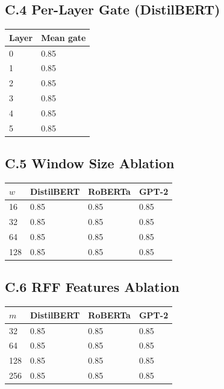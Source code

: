\subsection{C.4 Per-Layer Gate (DistilBERT)}

\begin{table}[H]
\centering
\small
\begin{tabular}{ll}
\toprule
\textbf{Layer} & \textbf{Mean gate} \\
\midrule
0 & 0.85 \\
1 & 0.85 \\
2 & 0.85 \\
3 & 0.85 \\
4 & 0.85 \\
5 & 0.85 \\
\bottomrule
\end{tabular}
\end{table}

\subsection{C.5 Window Size Ablation}

\begin{table}[H]
\centering
\small
\begin{tabular}{llll}
\toprule
\textbf{$w$} & \textbf{DistilBERT} & \textbf{RoBERTa} & \textbf{GPT-2} \\
\midrule
16 & 0.85 & 0.85 & 0.85 \\
32 & 0.85 & 0.85 & 0.85 \\
64 & 0.85 & 0.85 & 0.85 \\
128 & 0.85 & 0.85 & 0.85 \\
\bottomrule
\end{tabular}
\end{table}

\subsection{C.6 RFF Features Ablation}

\begin{table}[H]
\centering
\small
\begin{tabular}{llll}
\toprule
\textbf{$m$} & \textbf{DistilBERT} & \textbf{RoBERTa} & \textbf{GPT-2} \\
\midrule
32 & 0.85 & 0.85 & 0.85 \\
64 & 0.85 & 0.85 & 0.85 \\
128 & 0.85 & 0.85 & 0.85 \\
256 & 0.85 & 0.85 & 0.85 \\
\bottomrule
\end{tabular}
\end{table}

